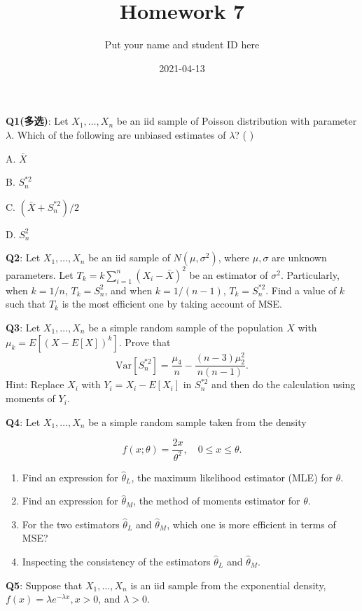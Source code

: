 \documentclass[]{article}
\title{Homework 7}
\author{Put your name and student ID here}
\date{2021-04-13}
\begin{document}
\maketitle

\textbf{Q1(多选)}: Let \(X_1,\dots,X_n\) be an iid sample of Poisson
distribution with parameter \(\lambda\). Which of the following are
unbiased estimates of \(\lambda\)? ( )

A. \(\bar X\)

B. \(S_n^{*2}\)

C. \((\bar X+S_n^{*2})/2\)

D. \(S_n^2\)

\textbf{Q2}: Let \(X_1,\dots,X_n\) be an iid sample of
\(N(\mu,\sigma^2)\), where \(\mu,\sigma\) are unknown parameters. Let
\(T_k=k\sum_{i=1}^n(X_i-\bar X)^2\) be an estimator of \(\sigma^2\).
Particularly, when \(k=1/n\), \(T_k=S_n^2\), and when \(k=1/(n-1)\),
\(T_k=S_n^{*2}\). Find a value of \(k\) such that \(T_k\) is the most
efficient one by taking account of MSE.

\textbf{Q3}: Let \(X_1,\dots,X_n\) be a simple random sample of the
population \(X\) with \(\mu_k = E[(X-E[X])^k]\). Prove that
\[\mathrm{Var}[S_n^{*2}]= \frac{\mu_4}{n}-\frac{(n-3)\mu_2^2}{n(n-1)}.\]
Hint: Replace \(X_i\) with \(Y_i=X_i-E[X_i]\) in \(S_n^{*2}\) and then
do the calculation using moments of \(Y_i\).

\textbf{Q4}: Let \(X_1,\dots,X_n\) be a simple random sample taken from
the density

\[f(x;\theta)=\frac{2x}{\theta^2},\quad 0\le x\le \theta.\]

\begin{enumerate}
\def\labelenumi{\arabic{enumi}.}
\item
  Find an expression for \(\hat\theta_L\), the maximum likelihood
  estimator (MLE) for \(\theta\).
\item
  Find an expression for \(\hat\theta_M\), the method of moments
  estimator for \(\theta\).
\item
  For the two estimators \(\hat\theta_L\) and \(\hat\theta_M\), which
  one is more efficient in terms of MSE?
\item
  Inspecting the consistency of the estimators \(\hat\theta_L\) and
  \(\hat\theta_M\).
\end{enumerate}

\textbf{Q5}: Suppose that \(X_1,\dots,X_n\) is an iid sample from the
exponential density, \(f(x)=\lambda e^{-\lambda x},x>0\), and
\(\lambda>0\).
\end{document}

